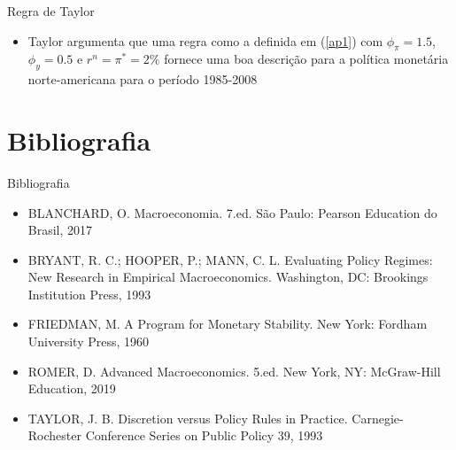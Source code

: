 \documentclass[10pt]{beamer}
\begin{document}
\begin{frame}{Regra de Taylor}
    \begin{itemize}
        \item Taylor argumenta que uma regra como a definida em (\ref{ap1}) com $\phi_\pi = 1.5$, $\phi_y = 0.5$ e $r^n = \pi^* = 2\%$ fornece uma boa descrição para a política monetária norte-americana para o período 1985-2008
        
        \hyperlink{voltar}{}
    \end{itemize}
    \end{frame}

\section{Bibliografia}
\begin{frame}{ Bibliografia}
    \begin{itemize}
        \item BLANCHARD, O. Macroeconomia. 7.ed. São Paulo: Pearson Education do Brasil, 2017\medskip        
        \item BRYANT, R. C.; HOOPER, P.; MANN, C. L. Evaluating Policy Regimes: New Research in Empirical Macroeconomics. Washington, DC: Brookings Institution Press, 1993\medskip
        \item FRIEDMAN, M. A Program for Monetary Stability. New York: Fordham University Press, 1960\medskip
        \item ROMER, D. Advanced Macroeconomics. 5.ed. New York, NY: McGraw-Hill Education, 2019 \medskip
        \item TAYLOR, J. B. Discretion versus Policy Rules in Practice. Carnegie-Rochester Conference Series on Public Policy 39, 1993
    \end{itemize}
\end{frame}
\end{document}
